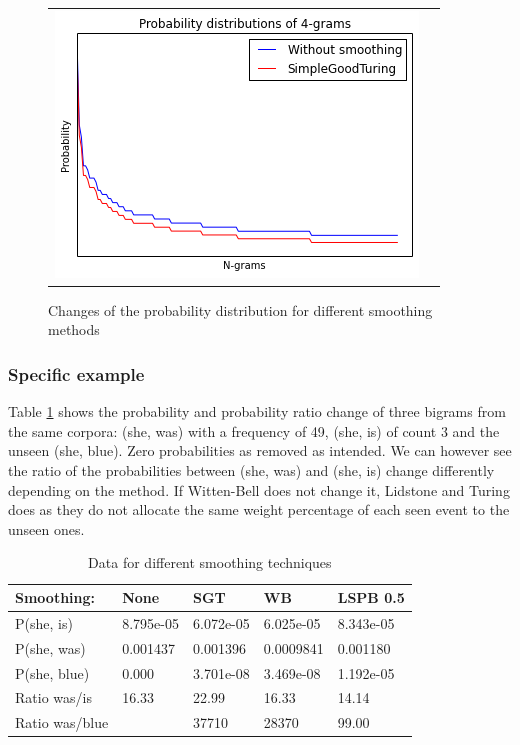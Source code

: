 \documentclass[a4paper,12pt]{article}
\begin{document}
\begin{figure}
\begin{tabular}{cc}
		\includegraphics[width=0.52\linewidth]{4_Turing} \\
	\end{tabular}
	\caption{Changes of the probability distribution for different smoothing methods}
\end{figure}

\subsubsection{Specific example}
	Table \ref{tab:smoothingprobs} shows the probability and probability ratio change of three bigrams from the same corpora: (she, was) with a frequency of 49, (she, is) of count 3 and the unseen (she, blue). Zero probabilities as removed as intended. We can however see the ratio of the probabilities between (she, was) and (she, is) change differently depending on the method. If Witten-Bell does not change it, Lidstone and Turing does as they do not allocate the same weight percentage of each seen event to the unseen ones.

\begin{table}[!h]
\small
\centering
\caption{Data for different smoothing techniques}
\label{tab:smoothingprobs}
\begin{tabular}{@{}lllll@{}}
\toprule
Smoothing:     & None      & SGT       & WB        & LSPB 0.5   \\ \midrule
P(she, is)     & 8.795e-05 & 6.072e-05 & 6.025e-05 & 8.343e-05  \\
P(she, was)    & 0.001437  & 0.001396  & 0.0009841 & 0.001180   \\
P(she, blue)   & 0.000     & 3.701e-08 & 3.469e-08 & 1.192e-05  \\
Ratio was/is   & 16.33     & 22.99     & 16.33     & 14.14      \\
Ratio was/blue &           & 37710     & 28370     & 99.00      \\ \bottomrule
\end{tabular}
\end{table}
\end{document}
